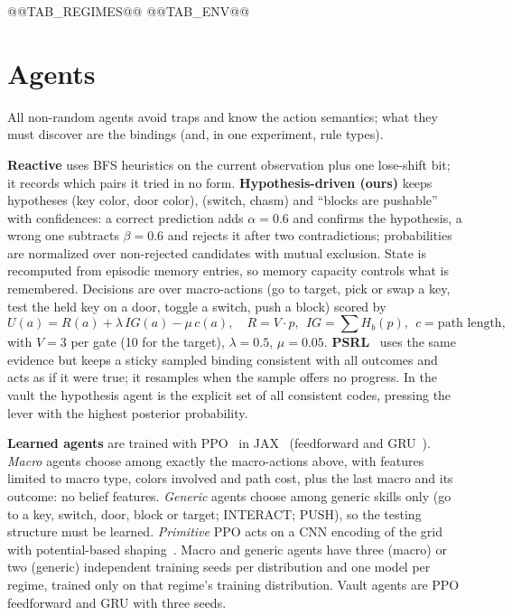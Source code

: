 \documentclass[runningheads]{llncs}
\begin{document}
@@TAB_REGIMES@@
@@TAB_ENV@@

\section{Agents}
All non-random agents avoid traps and know the action semantics; what they must discover are the bindings (and, in one experiment, rule types).

\textbf{Reactive} uses BFS heuristics on the current observation plus one lose-shift bit; it records which pairs it tried in no form. \textbf{Hypothesis-driven (ours)} keeps hypotheses (key color, door color), (switch, chasm) and ``blocks are pushable'' with confidences: a correct prediction adds $\alpha=0.6$ and confirms the hypothesis, a wrong one subtracts $\beta=0.6$ and rejects it after two contradictions; probabilities are normalized over non-rejected candidates with mutual exclusion. State is recomputed from episodic memory entries, so memory capacity controls what is remembered. Decisions are over macro-actions (go to target, pick or swap a key, test the held key on a door, toggle a switch, push a block) scored by
\begin{equation}
U(a)=R(a)+\lambda\,IG(a)-\mu\,c(a),\quad R=V\!\cdot\!p,\ \ IG=\textstyle\sum H_b(p),\ \ c=\text{path length},
\end{equation}
with $V=3$ per gate (10 for the target), $\lambda=0.5$, $\mu=0.05$. \textbf{PSRL}~\cite{strens2000,osband2013} uses the same evidence but keeps a sticky sampled binding consistent with all outcomes and acts as if it were true; it resamples when the sample offers no progress. In the vault the hypothesis agent is the explicit set of all consistent codes, pressing the lever with the highest posterior probability.

\textbf{Learned agents} are trained with PPO~\cite{schulman2017} in JAX~\cite{jax2018} (feedforward and GRU~\cite{cho2014}). \emph{Macro} agents choose among exactly the macro-actions above, with features limited to macro type, colors involved and path cost, plus the last macro and its outcome: no belief features. \emph{Generic} agents choose among generic skills only (go to a key, switch, door, block or target; INTERACT; PUSH), so the testing structure must be learned. \emph{Primitive} PPO acts on a CNN encoding of the grid with potential-based shaping~\cite{ng1999}. Macro and generic agents have three (macro) or two (generic) independent training seeds per distribution and one model per regime, trained only on that regime's training distribution. Vault agents are PPO feedforward and GRU with three seeds.
\end{document}
